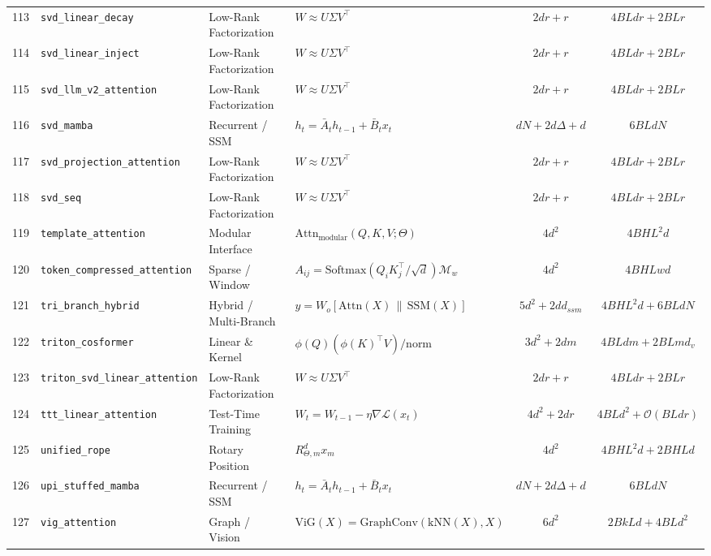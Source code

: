 \begin{center}
\begin{longtable}{rlllcc}
113 & \texttt{svd\_linear\_decay} & Low-Rank Factorization & $W \approx U \Sigma V^\top$ & $2 d r + r$ & $4 B L d r + 2 B L r$ \\
114 & \texttt{svd\_linear\_inject} & Low-Rank Factorization & $W \approx U \Sigma V^\top$ & $2 d r + r$ & $4 B L d r + 2 B L r$ \\
115 & \texttt{svd\_llm\_v2\_attention} & Low-Rank Factorization & $W \approx U \Sigma V^\top$ & $2 d r + r$ & $4 B L d r + 2 B L r$ \\
116 & \texttt{svd\_mamba} & Recurrent / SSM & $h_t = \bar{A}_t h_{t-1} + \bar{B}_t x_t$ & $d N + 2 d \Delta + d$ & $6 B L d N$ \\
117 & \texttt{svd\_projection\_attention} & Low-Rank Factorization & $W \approx U \Sigma V^\top$ & $2 d r + r$ & $4 B L d r + 2 B L r$ \\
118 & \texttt{svd\_seq} & Low-Rank Factorization & $W \approx U \Sigma V^\top$ & $2 d r + r$ & $4 B L d r + 2 B L r$ \\
119 & \texttt{template\_attention} & Modular Interface & $\text{Attn}_{\text{modular}}(Q,K,V; \Theta)$ & $4 d^2$ & $4 B H L^2 d$ \\
120 & \texttt{token\_compressed\_attention} & Sparse / Window & $A_{ij} = \text{Softmax}(Q_i K_j^\top / \sqrt{d}) \mathcal{M}_w$ & $4 d^2$ & $4 B H L w d$ \\
121 & \texttt{tri\_branch\_hybrid} & Hybrid / Multi-Branch & $y = W_o [\text{Attn}(X) \,\|\, \text{SSM}(X)]$ & $5 d^2 + 2 d d_{ssm}$ & $4 B H L^2 d + 6 B L d N$ \\
122 & \texttt{triton\_cosformer} & Linear \& Kernel & $\phi(Q)(\phi(K)^\top V) / \text{norm}$ & $3 d^2 + 2 d m$ & $4 B L d m + 2 B L m d_v$ \\
123 & \texttt{triton\_svd\_linear\_attention} & Low-Rank Factorization & $W \approx U \Sigma V^\top$ & $2 d r + r$ & $4 B L d r + 2 B L r$ \\
124 & \texttt{ttt\_linear\_attention} & Test-Time Training & $W_t = W_{t-1} - \eta \nabla \mathcal{L}(x_t)$ & $4 d^2 + 2 d r$ & $4 B L d^2 + \mathcal{O}(B L d r)$ \\
125 & \texttt{unified\_rope} & Rotary Position & $R_{\Theta, m}^d x_m$ & $4 d^2$ & $4 B H L^2 d + 2 B H L d$ \\
126 & \texttt{upi\_stuffed\_mamba} & Recurrent / SSM & $h_t = \bar{A}_t h_{t-1} + \bar{B}_t x_t$ & $d N + 2 d \Delta + d$ & $6 B L d N$ \\
127 & \texttt{vig\_attention} & Graph / Vision & $\text{ViG}(X) = \text{GraphConv}(\text{kNN}(X), X)$ & $6 d^2$ & $2 B k L d + 4 B L d^2$ \\

\end{longtable}
\end{center}
